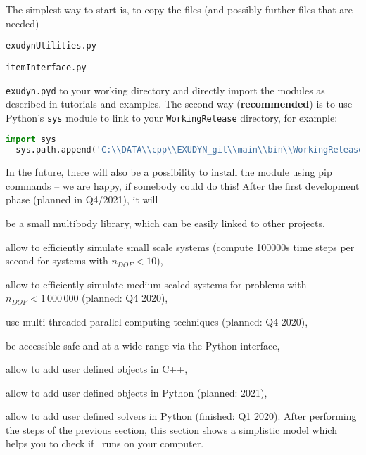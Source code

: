 The simplest way to start is, to copy the files (and possibly further files that are needed)
\bi
  \item \texttt{exudynUtilities.py}
  \item \texttt{itemInterface.py}
  \item \texttt{exudyn.pyd}
\ei
to your working directory and directly import the modules as described in tutorials and examples.
The second way ({\bf recommended}) is to use Python's \texttt{sys} module to link to your \texttt{WorkingRelease} directory, for example:\vspace{6pt}\\
\pythonstyle
\begin{lstlisting}[language=Python, firstnumber=1]
  import sys
  sys.path.append('C:\\DATA\\cpp\\EXUDYN_git\\main\\bin\\WorkingRelease')
\end{lstlisting}
In the future, there will also be a possibility to install the module using pip commands -- we are happy, if somebody could do this!
%
After the first development phase (planned in Q4/2021), it will
\bi
  \item be a small multibody library, which can be easily linked to other projects,
	\item allow to efficiently simulate small scale systems (compute 100000s time steps per second for systems with $n_{DOF}<10$),
	\item allow to efficiently simulate medium scaled systems for problems with $n_{DOF} < 1\,000\,000$ (planned: Q4 2020),
	\item use multi-threaded parallel computing techniques (planned: Q4 2020),
	\item be accessible safe and at a wide range via the Python interface,
	\item allow to add user defined objects in C++,
	\item allow to add user defined objects in Python (planned: 2021),
	\item allow to add user defined solvers in Python (finished: Q1 2020).
\ei
%
After performing the steps of the previous section, this section shows a simplistic model which helps you to check if \codeName\ runs on your computer.

